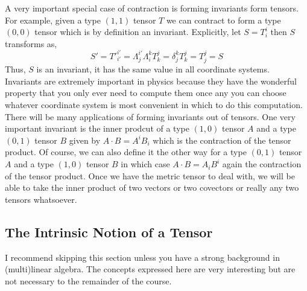 \documentclass[11pt, a4paper]{article}
\begin{document}
\par
A very important special case of contraction is forming invariants form tensors. For example, given a type $(1, 1)$ tensor $T$ we can contract to form a type $(0, 0)$ tensor which is by definition an invariant. Explicitly, let $S = T^{i}_{i}$ then $S$ transforms as,
\[ S' = T'^{i'}_{i'} = \Lambda^{i'}_{j} \Lambda_{i}^{k} T^{j}_{k} = \delta^{k}_{j} T^{j}_{k} = T^{j}_{j} = S\]
Thus, $S$ is an invariant, it has the same value in all coordinate systems. Invariants are extremely important in physics because they have the wonderful property that you only ever need to compute them once any you can choose whatever coordinate system is most convenient in which to do this computation. There will be many applications of forming invariants out of tensors. One very important invariant is the inner prodcut of a type $(1, 0)$ tensor $A$ and a type $(0, 1)$ tensor $B$ given by $A \cdot B = A^i B_i$ which is the contraction of the tensor product. Of course, we can also define it the other way for a type $(0, 1)$ tensor $A$ and a type $(1, 0)$ tensor $B$ in which case $A \cdot B = A_i B^i$ again the contraction of the tensor product. Once we have the metric tensor to deal with, we will be able to take the inner product of two vectors or two covectors or really any two tensors whatsoever. 

\subsection{The Intrinsic Notion of a Tensor}
\begin{remark}
I recommend skipping this section unless you have a strong background in (multi)linear algebra. The concepts expressed here are very interesting but are not necessary to the remainder of the course.
\end{remark}
\end{document}
